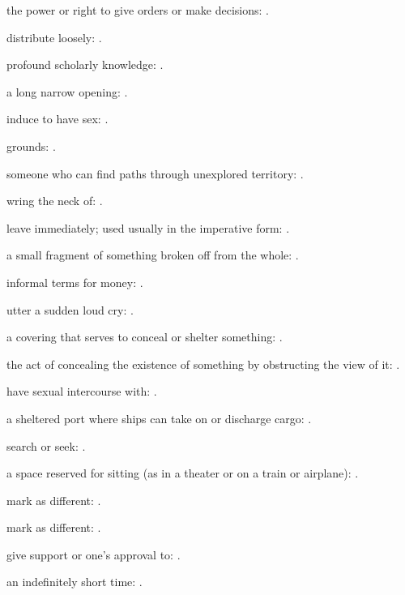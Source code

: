   the power or right to give orders or make decisions: .

  distribute loosely: .

  profound scholarly knowledge: .

  a long narrow opening: .

  induce to have sex: .

  grounds: .

  someone who can find paths through unexplored territory: .

  wring the neck of: .

  leave immediately; used usually in the imperative form: .

  a small fragment of something broken off from the whole: .

  informal terms for money: .

  utter a sudden loud cry: .

  a covering that serves to conceal or shelter something: .

  the act of concealing the existence of something by obstructing the view of it: .

  have sexual intercourse with: .

  a sheltered port where ships can take on or discharge cargo: .

  search or seek: .

  a space reserved for sitting (as in a theater or on a train or airplane): .

  mark as different: .

  mark as different: .

  give support or one's approval to: .

  an indefinitely short time: .

